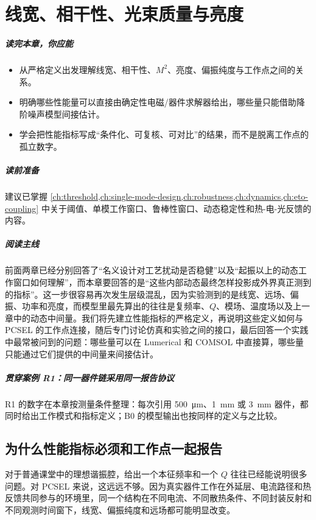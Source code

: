 ﻿%
\chapter{线宽、相干性、光束质量与亮度}
\label{ch:metrics}

\paragraph{读完本章，你应能}
\begin{itemize}
  \item 从严格定义出发理解线宽、相干性、$M^2$、亮度、偏振纯度与工作点之间的关系。
  \item 明确哪些性能量可以直接由确定性电磁/器件求解器给出，哪些量只能借助降阶噪声模型间接估计。
  \item 学会把性能指标写成“条件化、可复核、可对比”的结果，而不是脱离工作点的孤立数字。
\end{itemize}

\paragraph{读前准备}
建议已掌握 \cref{ch:threshold,ch:single-mode-design,ch:robustness,ch:dynamics,ch:eto-coupling} 中关于阈值、单模工作窗口、鲁棒性窗口、动态稳定性和热-电-光反馈的内容。

\paragraph{阅读主线}
前面两章已经分别回答了“名义设计对工艺扰动是否稳健”以及“起振以上的动态工作窗口如何理解”，而本章要回答的是“这些内部动态最终怎样投影成外界真正测到的指标”。这一步很容易再次发生层级混乱，因为实验测到的是线宽、远场、偏振、功率和亮度，而模型里最先算出的往往是复频率、$Q$、模场、温度场以及上一章中的动态中间量。我们将先建立性能指标的严格定义，再说明这些定义如何与 PCSEL 的工作点连接，随后专门讨论仿真和实验之间的接口，最后回答一个实践中最常被问到的问题：哪些量可以在 Lumerical 和 COMSOL 中直接算，哪些量只能通过它们提供的中间量来间接估计。

\paragraph{贯穿案例 R1：同一器件链采用同一报告协议}
R1 的数字在本章按测量条件整理：每次引用 \SI{500}{\micro\meter}、\SI{1}{mm} 或 \SI{3}{mm} 器件，都同时给出工作模式和指标定义；B0 的模型输出也按同样的定义与之比较。

\section{为什么性能指标必须和工作点一起报告}
对于普通课堂中的理想谐振腔，给出一个本征频率和一个 $Q$ 往往已经能说明很多问题。对 PCSEL 来说，这远远不够。因为真实器件工作在外延层、电流路径和热反馈共同参与的环境里，同一个结构在不同电流、不同散热条件、不同封装反射和不同观测时间窗下，线宽、偏振纯度和远场都可能明显改变。

